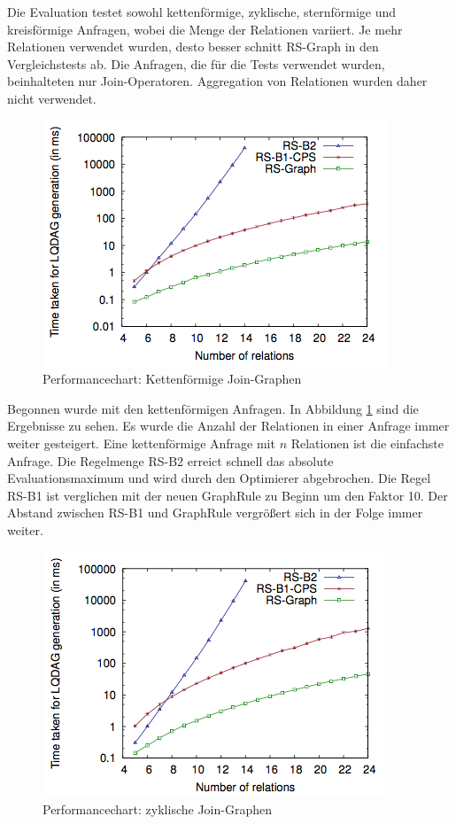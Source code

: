 Die Evaluation testet sowohl kettenförmige, zyklische, sternförmige und kreisförmige Anfragen, wobei die Menge der Relationen variiert. Je mehr Relationen verwendet wurden, desto besser schnitt RS-Graph in den Vergleichstests ab. Die Anfragen, die für die Tests verwendet wurden, beinhalteten nur Join-Operatoren. Aggregation von Relationen wurden daher nicht verwendet.


\begin{figure}[ht]
  \centering
  \includegraphics[scale=0.8]{03_Regeln/00_media/Kette.png}
  \caption{Performancechart: Kettenförmige Join-Graphen}
  \label{ketteEval}
\end{figure}

Begonnen wurde mit den kettenförmigen Anfragen. In Abbildung \ref{ketteEval} sind die Ergebnisse zu sehen. Es wurde die Anzahl der Relationen in einer Anfrage immer weiter gesteigert. Eine kettenförmige Anfrage mit $n$ Relationen ist die einfachste Anfrage. Die Regelmenge RS-B2 erreict schnell das absolute Evaluationsmaximum und wird durch den Optimierer abgebrochen. Die Regel RS-B1 ist verglichen mit der neuen GraphRule zu Beginn um den Faktor 10. Der Abstand zwischen RS-B1 und GraphRule vergrößert sich in der Folge immer weiter.

\begin{figure}[ht]
  \centering
  \includegraphics[scale=0.8]{03_Regeln/00_media/cycle.png}
  \caption{Performancechart: zyklische Join-Graphen}
  \label{cycleEval}
\end{figure}

